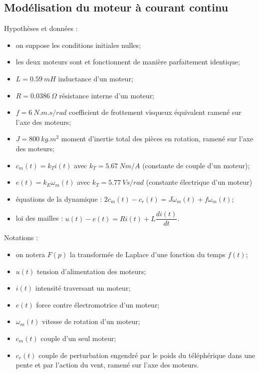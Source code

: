\documentclass[10pt,fleqn]{article} %
\begin{document}
\subsection{Modélisation du moteur à courant continu}
Hypothèses et données :
\begin{multicols}{2}
\begin{itemize}
\item on suppose les conditions initiales nulles;
\item les deux moteurs sont et fonctionnent de manière parfaitement identique;
\item $L=\SI{0,59}{mH}$ inductance d’un moteur;
\item $R=\SI{0,0386}{\Omega}$ résistance interne d’un moteur;
\item $f=\SI{6}{N.m.s/rad}$ coefficient de frottement visqueux équivalent ramené sur l’axe des moteurs;
\item $J=\SI{800}{kg.m^2}$ moment d’inertie total des pièces en rotation, ramené sur l’axe des moteurs; 
\item $c_m(t)=k_Ti(t)$ avec $k_T=\SI{5.67}{Nm/A}$ (constante de couple d’un moteur);
\item $e(t)=k_E\omega_m(t)$ avec $k_T=\SI{5.77}{Vs/rad}$   (constante électrique d’un moteur)
\item équations de la dynamique : $2c_m(t)-c_r(t)=J\dot{\omega}_m(t)+f\omega_m(t)$;
\item loi des mailles : $u(t)-e(t)=Ri(t)+L\dfrac{d i(t)}{dt}$.
\end{itemize}

\vspace{1.7cm}

Notations :

\begin{itemize}
\item on notera $F(p)$ la transformée de Laplace d’une fonction du temps $f(t)$;
\item $u(t)$ tension d’alimentation des moteurs;
\item $i(t)$ intensité traversant un moteur;
\item $e(t)$ force contre électromotrice d’un moteur;
\item $\omega_m(t)$ vitesse de rotation d’un moteur;
\item $c_m(t)$ couple d’un seul moteur;
\item $c_r(t)$ couple de perturbation engendré par le poids du téléphérique dans une pente et par l’action du vent, ramené sur l’axe des moteurs.
\end{itemize}
\end{multicols}
\end{document}
